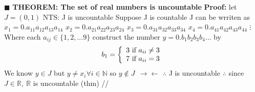 \documentclass[12pt]{article}
\begin{document}
	\(\blacksquare\) \newline \newline
	\textbf{THEOREM: The set of real numbers is uncountable}
	\newline \newline
	\textbf{Proof: } \newline
	let \(J=(0,1)\) \newline
	NTS: J is uncountable \newline
	Suppose J is countable \newline
	J can be wrriten as \newline
	\(x_1 = 0.\){\Large \textcircled{\small\(a_{11}\)}}\(a_{12}a_{13}a_{14}\) \newline
	\(x_2 = 0.a_{21}\){\Large \textcircled{\small\(a_{22}\)}}\(a_{23}a_{24}\) \newline
	\(x_3 = 0.a_{31}a_{32}\){\Large \textcircled{\small\(a_{33}\)}}\(a_{34}\) \newline
	\(x_4 = 0.a_{41}a_{42}a_{43}\){\Large \textcircled{\small\(a_{44}\)}}
	\newline \(\vdots \) \newline
	Where each \(a_{ij}\in\{1,2,...9\}\) \newline
	construct the number \newline
	\(y = 0.b_1b_2b_3b_4...\) by
	\newline
	\[b_1 =\left\{ \begin{array}{ccc} 3 \textup{ if } a_{ii} \neq 3\\ 7 \textup{ if } a_{ii} = 3
	\end{array}\right.\]
	We know \(y \in J\) but \(y \neq x_i \forall i \in \mathbb{N}\) so \(y \notin J\ \ \rightarrow \leftarrow\)
	\newline
	\(\therefore\) J is uncountable \newline
	\(\therefore\) since \(J \in \mathbb{R},\ \mathbb{R}\) is uncountable (thm) //
	\newpage
\end{document}
